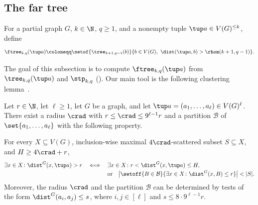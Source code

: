 \subsection{The far tree}\label{sec:ftree}

\begin{definition}\label{def:ftree}
For a partial graph $G$, $k\in\N$, $q\ge1$, and a nonempty tuple $\tup a\in V(G)^{\le k}$, define
\[
\ftree_{k,q}(\tup a)\coloneqq
\setof{\tree_{k+1,q-1}(b)}{b\in V(G),\ \dist(\tup a,b)>\rhom(k+1,q-1)}.
\]
\end{definition}

The goal of this subsection is to compute $\ftree_{k,q}(\tup a)$ from $\tree_{k,q}(\tup a)$ and $\stp_{k,q}$ ().
Our main tool is the following clustering lemma~\cite[Corollary~3.4 and Lemma~3.5]{locality-note}.

\begin{lemma}\label{lem:clustering}
Let $r\in\N$, let $\ell\ge1$, let $G$ be a graph, and let $\tup a=(a_1,\ldots,a_\ell)\in V(G)^\ell$.
There exist a radius $\crad$ with $r\le \crad\le9^{\ell-1}r$ and a partition $\mathcal B$ of $\set{a_1,\ldots,a_\ell}$ with the following property.

For every $X\subseteq V(G)$, inclusion-wise maximal $4\crad$-scattered subset $S \subseteq X$, and $H\ge4\crad+r$,
\[
\exists x\in X\colon \dist^G(x,\tup a)>r
\quad\Longleftrightarrow\quad
\begin{aligned}[t]
&\exists x\in X\colon r<\dist^G(x,\tup a)\le H,\\[-2pt]
&\text{or}\quad \bigl|\setoff{B\in\mathcal B}{\exists x\in X\colon \dist^G(x,B)\le r}\bigr|< |S|.
\end{aligned}
\]
Moreover, the radius $\crad$ and the partition $\mathcal B$ can be determined by tests of the form $\dist^G(a_i,a_j)\le s$, where $i,j\in[\ell]$ and $s\le8\cdot9^{\ell-1}r$.
\end{lemma}

